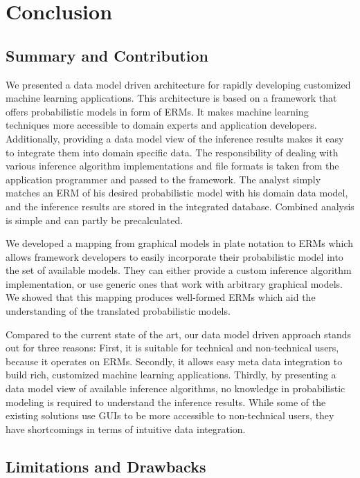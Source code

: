 \section{Conclusion}

\subsection{Summary and Contribution}

We presented a data model driven architecture for rapidly developing customized machine learning applications. This architecture is based on a framework that offers probabilistic models in form of ERMs. It makes machine learning techniques more accessible to domain experts and application developers. Additionally, providing a data model view of the inference results makes it easy to integrate them into domain specific data. The responsibility of dealing with various inference algorithm implementations and file formats is taken from the application programmer and passed to the framework. The analyst simply matches an ERM of his desired probabilistic model with his domain data model, and the inference results are stored in the integrated database. Combined analysis is simple and can partly be precalculated.

We developed a mapping from graphical models in plate notation to ERMs which allows framework developers to easily incorporate their probabilistic model into the set of available models. They can either provide a custom inference algorithm implementation, or use generic ones that work with arbitrary graphical models. We showed that this mapping produces well-formed ERMs which aid the understanding of the translated probabilistic models.

Compared to the current state of the art, our data model driven approach stands out for three reasons: First, it is suitable for technical and non-technical users, because it operates on ERMs. Secondly, it allows easy meta data integration to build rich, customized machine learning applications. Thirdly, by presenting a data model view of available inference algorithms, no knowledge in probabilistic modeling is required to understand the inference results. While some of the existing solutions use GUIs to be more accessible to non-technical users, they have shortcomings in terms of intuitive data integration.

\subsection{Limitations and Drawbacks}

